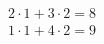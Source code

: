 \documentclass[preview]{standalone}
\begin{document}
\begin{align*}
2 \cdot 1 + 3 \cdot 2 = 8 \\ 1 \cdot 1 + 4 \cdot 2 = 9
\end{align*}
\end{document}
